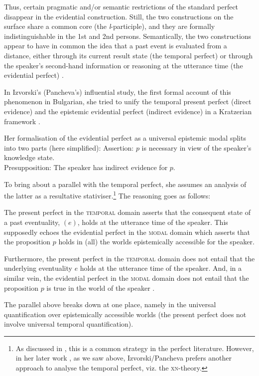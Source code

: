 \documentclass[output=paper,colorlinks,citecolor=brown]{langscibook}
\begin{document}
Thus, certain pragmatic and/or semantic restrictions of the standard perfect disappear in the evidential construction. Still, the two constructions on the surface share a common core (the \textit{l}-participle), and they are formally indistinguishable in the 1st and 2nd persons. Semantically, the two constructions appear to have in common the idea that a past event is evaluated from a  distance, either through its current result state (the temporal perfect) or through  the speaker's second-hand information or reasoning  at the utterance time (the evidential perfect) \citep{gvozdanovic1995}.  

In Izvorski's (Pancheva's) influential study, the first formal account of this phenomenon in Bulgarian, she tried to unify the temporal present perfect (direct evidence) and the epistemic evidential perfect (indirect evidence) in a Kratzerian framework \citep[225]{Izvorski1997}.

Her  formalisation of the evidential perfect as a universal epistemic modal splits into two parts (here simplified):
\ea
Assertion: $p$ is necessary in view of the speaker's knowledge state. 
\\ Presupposition: The speaker has indirect evidence for $p$. \\ 
\z
  
\noindent To bring about a parallel with the temporal perfect, she assumes an analysis of the latter as a resultative stativiser.\footnote{As discussed in \citet{gronn_stechow2020}, this is a common strategy in the perfect literature. However, in her later work \citep{pancheva03}, as we saw above, Izvorski/Pancheva prefers another approach to analyse the temporal perfect, viz. the \textsc{xn}-theory.} The reasoning goes as follows:

The present perfect in the \textsc{temporal} domain asserts that the consequent state of a past eventuality, $(e)$, holds at the utterance time of the speaker. This supposedly echoes the evidential perfect in the \textsc{modal} domain which asserts that the proposition $p$ holds in (all) the worlds epistemically accessible for the speaker.

Furthermore,
the present perfect in the \textsc{temporal} domain does not entail that the underlying eventuality $e$ holds at the utterance time of the speaker. And, in a similar vein,
the evidential perfect in the \textsc{modal} domain does not entail that the proposition $p$ is true in the world of the speaker \citep[226]{Izvorski1997}. 

The parallel above breaks down at one place, namely in the universal quantification over epistemically accessible worlds (the present perfect does not involve universal temporal quantification). 
\end{document}
